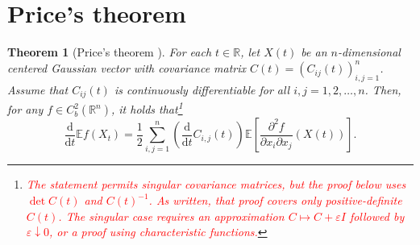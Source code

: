 \documentclass[11pt]{article}
\newtheorem{theorem}{Theorem}[section]
\numberwithin{equation}{section}
\newcommand{\E}{\mathbb{E}}
\newcommand{\1}{\mathbf 1}
\begin{document}
\section{Price's theorem}\label{sec:Price}

\begin{theorem}[Price's theorem \cite{Price}]\label{thm:Price}
For each $t\in {\mathbb R}$, let $X(t)$ be an $n$-dimensional centered Gaussian vector with covariance matrix $C(t) = (C_{ij}(t))_{i,j =1}^n$. 
Assume that $C_{ij}(t)$ is continuously differentiable for all $i,j =1,2, \dots ,n$. 
Then, for any $f\in C_b^2 ({\mathbb R}^n)$, it holds that\footnote{\textcolor{red}{The statement permits singular covariance matrices, but the proof below uses $\det C(t)$ and $C(t)^{-1}$.  As written, that proof covers only positive-definite $C(t)$.  The singular case requires an approximation $C\mapsto C+\varepsilon I$ followed by $\varepsilon\downarrow0$, or a proof using characteristic functions.}}
\[
\frac{\mathrm d}{\mathrm dt} \E f(X_t) = \frac{1}{2} \sum _{i,j =1}^n \left( \frac{\mathrm d}{\mathrm dt} C_{i,j}(t)\right) \E \left[ \frac{\partial ^2 f}{\partial x_i \partial x_j} (X(t)) \right] .
\]
\end{theorem}
\end{document}
